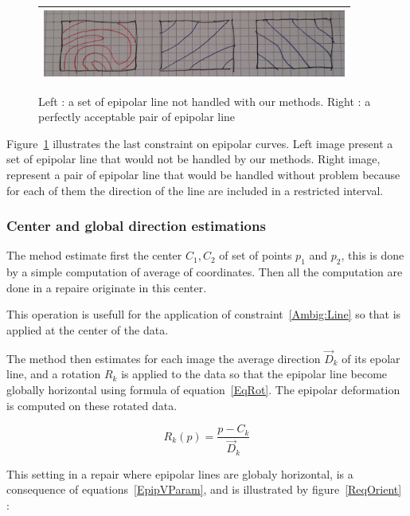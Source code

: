 \documentclass{ipol}
\begin{document}
\begin{figure}
\centering
\begin{tabular}{||c||}
 \hline \hline
\includegraphics[width=10cm]{FIGS/BadGoodLines.jpg}
 \\ \hline \hline
\end{tabular}
\caption{Left : a set of epipolar line not handled with our methods. Right : a perfectly acceptable pair  of epipolar line}
\label{BadGoodEpip}
\end{figure}

Figure~\ref{BadGoodEpip} illustrates the last constraint on epipolar curves. Left image present a set
of epipolar line that would not be handled by our methods.  Right image, represent a pair of epipolar line
that would be handled without problem because for each of them the direction of the line are included
in a restricted interval. 


\subsubsection{Center and global direction estimations}

The mehod estimate first the center $C_1,C_2$ of set of points $p_1$ and $p_2$, this is done by
a simple computation of average of coordinates.  Then all the computation are done in
a repaire originate in this center. 

This operation is usefull for the  application of constraint~\ref{Ambig:Line} so that is applied
at the center of the data.



The method then estimates for each image the average direction $\vec{D}_k$
of its epolar line, and a rotation $R_k$ is applied to the data so that the epipolar line become
globally horizontal using formula of equation~\eqref{EqRot}.
The  epipolar deformation is computed on these rotated data.

\begin{equation}
    R_k(p) =  \frac{p-C_k}{\vec{D}_k}  \label{EqRot}
\end{equation}


This setting in a repair where epipolar lines are globaly horizontal, is
a consequence of equations~\ref{EpipVParam}, and is illustrated by figure~\ref{ReqOrient} :
\end{document}
